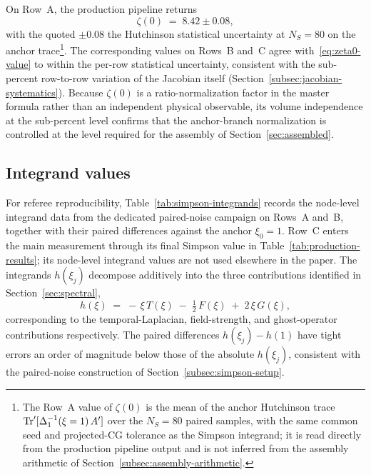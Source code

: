 \documentclass[a4paper,11pt]{article}
\theoremstyle{definition}
\newcommand{\Tr}{\mathop{\rm Tr}}
\begin{document}
On Row~A, the production pipeline returns
\begin{equation}
\zeta(0) \;=\; 8.42 \pm 0.08,
\label{eq:zeta0-value}
\end{equation}
with the quoted $\pm 0.08$ the Hutchinson statistical uncertainty at
$N_S = 80$ on the anchor trace\footnote{The Row~A value of $\zeta(0)$ is the mean of the anchor
Hutchinson trace $\Tr'[\Delta_1^{-1}(\xi=1)\,A']$ over the
$N_S = 80$ paired samples, with the same common seed and
projected-CG tolerance as the Simpson integrand; it is read
directly from the production pipeline output and is not inferred
from the assembly arithmetic of Section~\ref{subsec:assembly-arithmetic}.}. The corresponding values on Rows~B and~C agree with~\eqref{eq:zeta0-value}
to within the per-row statistical uncertainty, consistent with the
sub-percent row-to-row variation of the Jacobian itself
(Section~\ref{subsec:jacobian-systematics}). Because $\zeta(0)$ is a
ratio-normalization factor in the master formula rather than an
independent physical observable, its volume independence at the
sub-percent level confirms that the anchor-branch normalization is
controlled at the level required for the assembly of
Section~\ref{sec:assembled}.

\subsection{Integrand values}
\label{subsec:integrand-values}

For referee reproducibility, Table~\ref{tab:simpson-integrands}
records the node-level integrand data from the dedicated
paired-noise campaign on Rows~A and~B, together with their paired
differences against the anchor $\xi_0 = 1$. Row~C enters the main
measurement through its final Simpson value in
Table~\ref{tab:production-results}; its node-level integrand values
are not used elsewhere in the paper. The integrands $h(\xi_j)$
decompose additively into the three contributions identified in
Section~\ref{sec:spectral},
\begin{equation}
h(\xi) \;=\; -\,\xi\,T(\xi)
\;-\; \tfrac{1}{2}\,F(\xi)
\;+\; 2\,\xi\,G(\xi),
\label{eq:integrand-decomposition}
\end{equation}
corresponding to the temporal-Laplacian, field-strength, and
ghost-operator contributions respectively. The paired differences
$h(\xi_j) - h(1)$ have tight errors an order of magnitude below
those of the absolute $h(\xi_j)$, consistent with the paired-noise
construction of Section~\ref{subsec:simpson-setup}.
\end{document}
